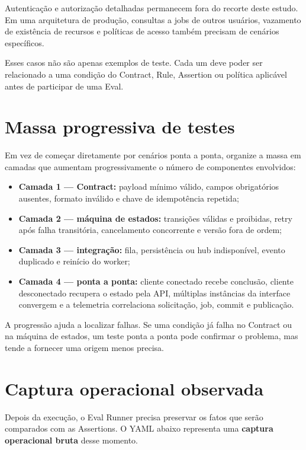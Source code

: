 \documentclass[
  10pt,
  a4paper,
  oneside]{book}
\providecommand{\tightlist}{%
  \setlength{\itemsep}{0pt}\setlength{\parskip}{0pt}}
\begin{document}
Autenticação e autorização detalhadas permanecem fora do recorte deste
estudo. Em uma arquitetura de produção, consultas a jobs de outros
usuários, vazamento de existência de recursos e políticas de acesso
também precisam de cenários específicos.

Esses casos não são apenas exemplos de teste. Cada um deve poder ser
relacionado a uma condição do Contract, Rule, Assertion ou política
aplicável antes de participar de uma Eval.

\hypertarget{massa-progressiva-de-testes}{%
\section{Massa progressiva de
testes}\label{massa-progressiva-de-testes}}

Em vez de começar diretamente por cenários ponta a ponta, organize a
massa em camadas que aumentam progressivamente o número de componentes
envolvidos:

\begin{itemize}
\tightlist
\item
  \textbf{Camada 1 --- Contract:} payload mínimo válido, campos
  obrigatórios ausentes, formato inválido e chave de idempotência
  repetida;
\item
  \textbf{Camada 2 --- máquina de estados:} transições válidas e
  proibidas, retry após falha transitória, cancelamento concorrente e
  versão fora de ordem;
\item
  \textbf{Camada 3 --- integração:} fila, persistência ou hub
  indisponível, evento duplicado e reinício do worker;
\item
  \textbf{Camada 4 --- ponta a ponta:} cliente conectado recebe
  conclusão, cliente desconectado recupera o estado pela API, múltiplas
  instâncias da interface convergem e a telemetria correlaciona
  solicitação, job, commit e publicação.
\end{itemize}

A progressão ajuda a localizar falhas. Se uma condição já falha no
Contract ou na máquina de estados, um teste ponta a ponta pode confirmar
o problema, mas tende a fornecer uma origem menos precisa.

\hypertarget{captura-operacional-observada}{%
\section{Captura operacional
observada}\label{captura-operacional-observada}}

Depois da execução, o Eval Runner precisa preservar os fatos que serão
comparados com as Assertions. O YAML abaixo representa uma
\textbf{captura operacional bruta} desse momento.
\end{document}
